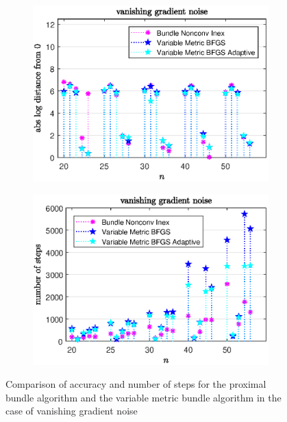 \vspace{-1.5em}

\begin{figure}[H]
	\begin{subfigure}{0.49\textwidth}
		\includegraphics[width=\textwidth]{Pictures/Plots/vanishing_gradient_noise_b.eps}%
	\end{subfigure}
	\begin{subfigure}{0.49\textwidth}
		\includegraphics[width=\textwidth]{Pictures/Plots/steps_vanishing_gradient_noise_b.eps}%
	\end{subfigure}
	\caption{Comparison of accuracy and number of steps for the proximal bundle algorithm and the variable metric bundle algorithm in the case of vanishing gradient noise}%
	\label{fig_van_grad_noise_large}%
\end{figure}

